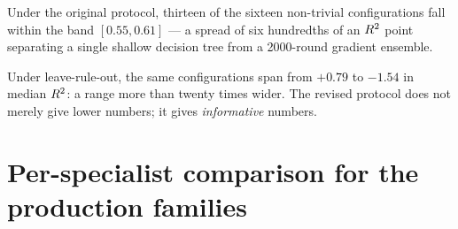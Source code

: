 \begin{findingbox}[title=The discriminating power of the two protocols]
Under the original protocol, thirteen of the sixteen non-trivial
configurations fall within the band $[0.55, 0.61]$ --- a spread of six
hundredths of an $R^2$ point separating a single shallow decision tree
from a 2000-round gradient ensemble.

Under leave-rule-out, the same configurations span from $+0.79$ to
$-1.54$ in median $R^2$: a range more than twenty times wider. The
revised protocol does not merely give lower numbers; it gives
\emph{informative} numbers.
\end{findingbox}

\section{Per-specialist comparison for the production families}


